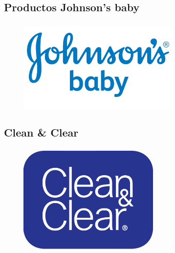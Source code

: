 \documentclass[compress, aspectratio=169]{beamer} %
\begin{document}
	\subsection{Productos Johnson's baby}
		\begin{frame}
	\transdissolve[duration=1]

			\frametitle{\insertsubsection}
			
			\begin{figure}
				\center\includegraphics[width=8cm]{baby.jpeg}
			\end{figure}
			
			
		\end{frame}
		
		\subsection{Clean \& Clear}
			\begin{frame}
	\transdissolve[duration=1]

				\frametitle{\insertsubsection}
				
			\begin{figure}
				\center\includegraphics[width=7cm]{clean.jpeg}
			\end{figure}
			
				
			\end{frame}
	
\end{document}
